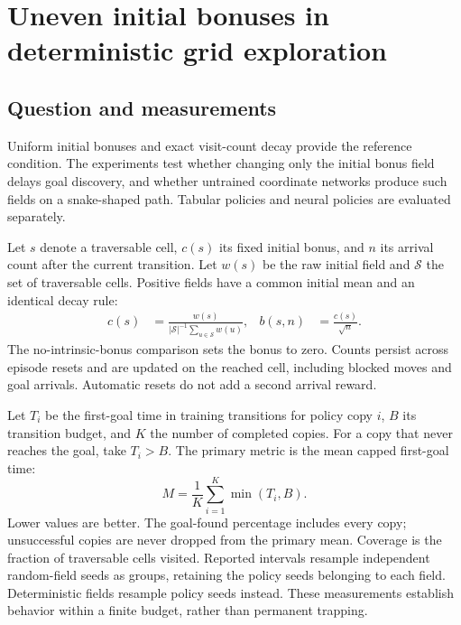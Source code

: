 \section{Uneven initial bonuses in deterministic grid exploration}
\label{sec:grid-initialization}

\subsection{Question and measurements}
Uniform initial bonuses and exact visit-count decay provide the reference condition.
The experiments test whether changing only the initial bonus field delays goal discovery,
and whether untrained coordinate networks produce such fields on a snake-shaped path.
Tabular policies and neural policies are evaluated separately.

Let $s$ denote a traversable cell, $c(s)$ its fixed initial bonus, and $n$ its arrival count
after the current transition. Let $w(s)$ be the raw initial field and $\mathcal S$ the set of
traversable cells. Positive fields have a common initial mean and an identical decay rule:
\begin{align}
c(s) &= \frac{w(s)}{|\mathcal S|^{-1}\sum_{u\in\mathcal S}w(u)}, &
b(s,n) &= \frac{c(s)}{\sqrt n}.
\end{align}
The no-intrinsic-bonus comparison sets the bonus to zero. Counts persist across episode
resets and are updated on the reached cell, including blocked moves and goal arrivals.
Automatic resets do not add a second arrival reward.

Let $T_i$ be the first-goal time in training transitions for policy copy $i$, $B$ its
transition budget, and $K$ the number of completed copies. For a copy that never reaches the
goal, take $T_i>B$. The primary metric is the mean capped first-goal time:
\begin{equation}
M=\frac{1}{K}\sum_{i=1}^{K}\min(T_i,B).
\end{equation}
Lower values are better. The goal-found percentage includes every copy; unsuccessful copies
are never dropped from the primary mean. Coverage is the fraction of traversable cells visited.
Reported intervals resample independent random-field seeds as groups, retaining the policy
seeds belonging to each field. Deterministic fields resample policy seeds instead.
These measurements establish behavior within a finite budget, rather than permanent trapping.

